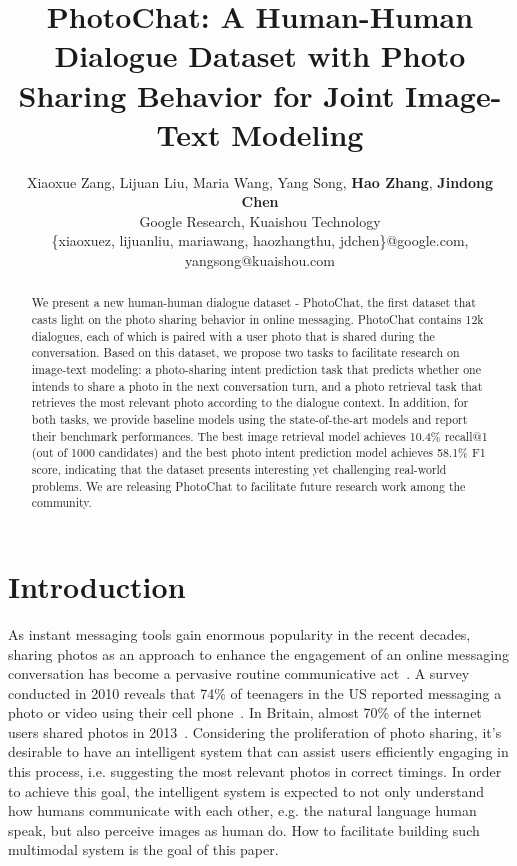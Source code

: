 \documentclass[11pt,a4paper]{article}
\title{{P}hoto{C}hat: A Human-Human Dialogue Dataset with Photo Sharing Behavior for Joint Image-Text Modeling}
\author{Xiaoxue Zang\Mark{1}, Lijuan Liu\Mark{1}, Maria Wang\Mark{1}, Yang Song\Mark{2}\Thanks{ Research conducted while working at Google.}, 
{\bf Hao Zhang\Mark{1}}, {\bf Jindong Chen\Mark{1}} \\
\Mark{1} Google Research, \Mark{2} Kuaishou Technology \\
\Mark{1}\{xiaoxuez, 
lijuanliu, mariawang, haozhangthu, jdchen\}@google.com, \\ 
\Mark{2} yangsong@kuaishou.com}
\date{}
\begin{document}
\maketitle
\begin{abstract}
We present a new human-human dialogue dataset - PhotoChat, the first dataset that casts light on the photo sharing behavior in online messaging. PhotoChat contains 12k dialogues, each of which is paired with a user photo that is shared during the conversation. Based on this dataset, we propose two tasks to facilitate research on image-text modeling: a photo-sharing intent prediction task that predicts whether one intends to share a photo in the next conversation turn, and a photo retrieval task that retrieves the most relevant photo according to the dialogue context. In addition, for both tasks, we provide baseline models using the state-of-the-art models and report their benchmark performances. The best image retrieval model achieves 10.4\% recall@1 (out of 1000 candidates) and the best photo intent prediction model achieves 58.1\% F1 score, indicating that the dataset presents interesting yet challenging real-world problems. We are releasing PhotoChat to facilitate future research work among the community. 


\end{abstract}

\section{Introduction}\label{sec:intro}



As instant messaging tools gain enormous popularity in the recent decades, sharing photos as an approach to enhance the engagement of an online messaging conversation has become a pervasive routine communicative act~\cite{Lobinger2016}. A survey conducted in 2010 reveals that 74\% of teenagers in the US reported messaging a photo or video using their cell phone~\cite{Lenhart2010TeensAM}. In Britain, almost 70\% of the internet users shared photos in 2013~\cite{Dutton2013}. Considering the proliferation of photo sharing, it's desirable to have an intelligent system that can assist users efficiently engaging in this process, i.e. suggesting the most relevant photos in correct timings. In order to achieve this goal, the intelligent system is expected to not only understand how humans communicate with each other, e.g. the natural language human speak, but also perceive images as human do. How to facilitate building such multimodal system is the goal of this paper.
\end{document}
